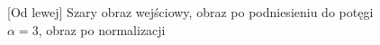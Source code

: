 \documentclass[a4paper,12pt, titlepage]{report}
\begin{document}
\FloatBarrier
\begin{figure}[h]
    \centering
    \caption{[Od lewej] Szary obraz wejściowy, obraz po podniesieniu do potęgi \(\alpha=3\), obraz po normalizacji}%
    \label{fig:geo_after_grey1}%
\end{figure}
\FloatBarrier
\end{document}
